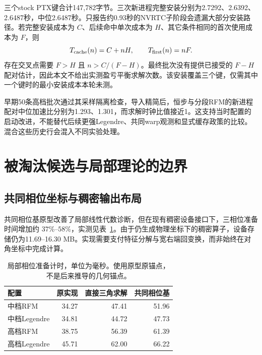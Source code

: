 三个stock PTX键合计147,782字节。三次新进程完整安装分别为2.7292、2.6392、2.6487秒，中位2.6487秒。只报告约0.93秒的NVRTC子阶段会遗漏大部分安装路径。若完整安装成本为 $C$、后续命中单次成本为 $H$、其它条件相同的首次使用成本为 $F$，则
\begin{equation}
\label{eq:cache-amortization}
 T_{\rm cache}(n)=C+nH,\qquad T_{\rm first}(n)=nF.
\end{equation}
存在交叉点需要 $F>H$ 且 $n>C/(F-H)$。最终批次没有提供已接受的 $F-H$ 配对估计，因此本文不给出实测盈亏平衡求解次数。该安装覆盖三个键，仅需其中一个键时的最小安装成本本轮未测。

早期50条高档批次通过其采样隔离检查，导入精简后，恒步与分段RFM的新进程配对中位加速比分别为1.293、1.301，而求解时钟比值接近1。这支持当时配置的启动改进，不能替代后续更强Legendre、共同warp观测和显式缓存政策的比较。混合这些历史行会混入不同实验处理。



\section{被淘汰候选与局部理论的边界}
\label{sec:negative-results}

\subsection{共同相位坐标与稠密输出布局}

共同相位基原型改善了局部线性代数诊断，但在现有稠密设备接口下，三相位准备时间增加约 $37\%$--$58\%$，实测见表~\ref{tab:phase-setup}。由于仍生成物理坐标下的稠密算子，设备存储仍为11.69--16.30 MB。实现需要支付特征分解与宽右端回变换，而非始终在对角坐标中完成计算。

\begin{table}[tbp]
\centering\small
\caption{局部相位准备计时，单位为毫秒。使用原型原锚点，不是后来推导的几何锚点。}
\label{tab:phase-setup}
\begin{tabularx}{\linewidth}{@{}Xrrr@{}}
\toprule
配置 & 原实现 & 直接三角求解 & 共同相位基 \\
\midrule
中档RFM & 34.27 & 47.41 & 51.96 \\
中档Legendre & 34.81 & 44.72 & 47.73 \\
高档RFM & 38.75 & 56.39 & 61.39 \\
高档Legendre & 45.71 & 62.00 & 66.22 \\
\bottomrule
\end{tabularx}
\end{table}

